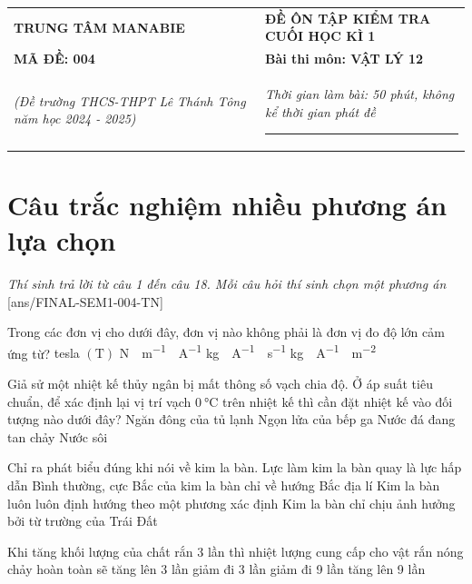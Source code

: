 \begin{tabular}{M{7cm}M{10.5cm}}
	\textbf{TRUNG TÂM MANABIE}& \textbf{ĐỀ ÔN TẬP KIỂM TRA CUỐI HỌC KÌ 1}\\
	\textbf{MÃ ĐỀ: 004}& \textbf{Bài thi môn: VẬT LÝ 12}\\
	\textit{(Đề trường THCS-THPT Lê Thánh Tông năm học 2024 - 2025)}& \textit{Thời gian làm bài: 50 phút, không kể thời gian phát đề}
	
	\noindent\rule{4cm}{0.8pt} \\
\end{tabular}
\setcounter{section}{0}
\section{Câu trắc nghiệm nhiều phương án lựa chọn}
\textit{Thí sinh trả lời từ câu 1 đến câu 18. Mỗi câu hỏi thí sinh chọn một phương án}
\setcounter{ex}{0}
[ans/FINAL-SEM1-004-TN]
\begin{ex}
	Trong các đơn vị cho dưới đây, đơn vị nào không phải là đơn vị đo độ lớn cảm ứng từ?
	\choice
	{tesla $\left(\si{\tesla}\right)$}
	{\si{\newton\cdot\meter^{-1}\cdot\ampere^{-1}}}
	{\si{\kilogram\cdot\ampere^{-1}\cdot\second^{-1}}}
	{\si{\kilogram\cdot\ampere^{-1}\cdot\meter^{-2}}}
	\loigiai{}
\end{ex}
\begin{ex}
	Giả sử một nhiệt kế thủy ngân bị mất thông số vạch chia độ. Ở áp suất tiêu chuẩn, để xác định lại vị trí vạch $\SI{0}{\celsius}$ trên nhiệt kế thì cần đặt nhiệt kế vào đối tượng nào dưới đây?
	\choice
	{Ngăn đông của tủ lạnh}
	{Ngọn lửa của bếp ga}
	{Nước đá đang tan chảy}
	{Nước sôi}
	\loigiai{}
\end{ex}
\begin{ex}
	Chỉ ra phát biểu đúng khi nói về kim la bàn.
	\choice
	{Lực làm kim la bàn quay là lực hấp dẫn}
	{Bình thường, cực Bắc của kim la bàn chỉ về hướng Bắc địa lí}
	{Kim la bàn luôn luôn định hướng theo một phương xác định}
	{Kim la bàn chỉ chịu ảnh hưởng bởi từ trường của Trái Đất}
	\loigiai{}
\end{ex}
\begin{ex}
	Khi tăng khối lượng của chất rắn 3 lần thì nhiệt lượng cung cấp cho vật rắn nóng chảy hoàn toàn sẽ
	\choice
	{tăng lên 3 lần}
	{giảm đi 3 lần}
	{giảm đi 9 lần}
	{tăng lên 9 lần}
	\loigiai{}
\end{ex}
